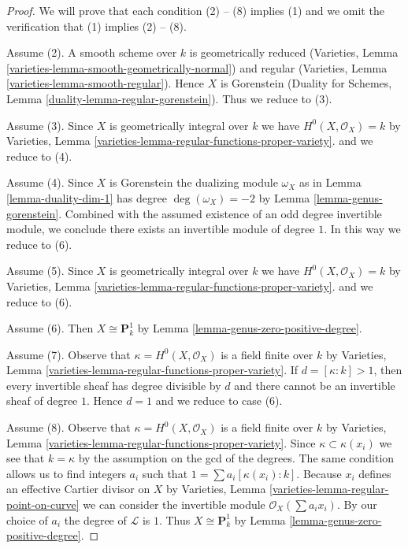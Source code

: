 \begin{proof}
We will prove that each condition (2) -- (8) implies (1) and we omit
the verification that (1) implies (2) -- (8).

\medskip\noindent
Assume (2). A smooth scheme over $k$ is geometrically reduced
(Varieties, Lemma \ref{varieties-lemma-smooth-geometrically-normal})
and regular (Varieties, Lemma \ref{varieties-lemma-smooth-regular}).
Hence $X$ is Gorenstein (Duality for Schemes, Lemma
\ref{duality-lemma-regular-gorenstein}).
Thus we reduce to (3).

\medskip\noindent
Assume (3). Since $X$ is geometrically integral over $k$ we have
$H^0(X, \mathcal{O}_X) = k$ by
Varieties, Lemma \ref{varieties-lemma-regular-functions-proper-variety}.
and we reduce to (4).

\medskip\noindent
Assume (4). Since $X$ is Gorenstein the dualizing module
$\omega_X$ as in Lemma \ref{lemma-duality-dim-1} has degree
$\deg(\omega_X) = -2$ by Lemma \ref{lemma-genus-gorenstein}.
Combined with the assumed existence of an odd degree invertible
module, we conclude there exists an invertible module of degree $1$.
In this way we reduce to (6).

\medskip\noindent
Assume (5). Since $X$ is geometrically integral over $k$ we have
$H^0(X, \mathcal{O}_X) = k$ by
Varieties, Lemma \ref{varieties-lemma-regular-functions-proper-variety}.
and we reduce to (6).

\medskip\noindent
Assume (6). Then $X \cong \mathbf{P}^1_k$ by
Lemma \ref{lemma-genus-zero-positive-degree}.

\medskip\noindent
Assume (7). Observe that $\kappa = H^0(X, \mathcal{O}_X)$ is a field
finite over $k$ by
Varieties, Lemma \ref{varieties-lemma-regular-functions-proper-variety}.
If $d = [\kappa : k] > 1$, then every invertible sheaf has degree
divisible by $d$ and there cannot be an invertible sheaf of degree $1$.
Hence $d = 1$ and we reduce to case (6).

\medskip\noindent
Assume (8). Observe that $\kappa = H^0(X, \mathcal{O}_X)$ is a field
finite over $k$ by
Varieties, Lemma \ref{varieties-lemma-regular-functions-proper-variety}.
Since $\kappa \subset \kappa(x_i)$ we see that $k = \kappa$
by the assumption on the gcd of the degrees. The same condition
allows us to find integers $a_i$ such that
$1 = \sum a_i[\kappa(x_i) : k]$. Because $x_i$ defines an
effective Cartier divisor on $X$ by
Varieties, Lemma \ref{varieties-lemma-regular-point-on-curve}
we can consider the invertible module $\mathcal{O}_X(\sum a_i x_i)$.
By our choice of $a_i$ the degree of $\mathcal{L}$ is $1$.
Thus $X \cong \mathbf{P}^1_k$ by Lemma \ref{lemma-genus-zero-positive-degree}.
\end{proof}

